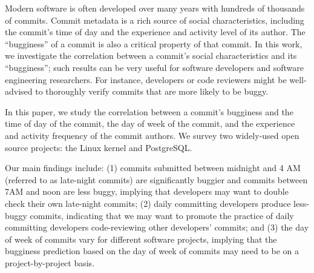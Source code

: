 Modern software is often developed over many years with hundreds of
thousands of commits. Commit metadata is a rich source of social
characteristics, including the commit's time of day and the
experience and activity level of its author.  The ``bugginess'' of a
commit is also a critical property of that commit.  In this work, we
investigate the correlation between a commit's social characteristics
and its ``bugginess''; such results can be very useful for software
developers and software engineering researchers. For instance,
developers or code reviewers might be well-advised to thoroughly
verify commits that are more likely to be buggy.

In this paper, we study the correlation between a commit's bugginess
and the time of day of the commit, the day of week of the commit, and
the experience and activity frequency of the commit authors.  We
survey two widely-used open source projects: the Linux kernel and
PostgreSQL.  

Our main findings include: (1) commits submitted between midnight and
4 AM (referred to as late-night commits) are significantly buggier 
and commits between 7AM and noon are less buggy, implying that developers 
may want to double check their own late-night commits; 
(2) daily committing developers produce less-buggy commits, indicating that we may 
want to promote the practice of daily committing developers code-reviewing other 
developers' commits; and (3) 
the day of week of commits
vary for different software projects, implying that the bugginess prediction based on 
the day of week of commits may need to be on a project-by-project basis.




